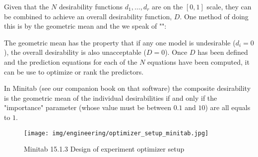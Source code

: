 	Given that the $N$ desirability functions $d_1,\ldots, d_r$ are on the $[0,1]$ scale, they can be combined to achieve an overall desirability function, $D$. One method of doing this is by the geometric mean and the we speak of "":
	
	The geometric mean has the property that if any one model is undesirable ($d_i=0$), the overall desirability is also unacceptable ($D=0$). Once $D$ has been defined and the prediction equations for each of the $N$ equations have been computed, it can be use to optimize or rank the predictors.

	In Minitab (see our companion book on that software) the composite desirability is the geometric mean of the individual desirabilities if and only if the "importance" parameter  (whose value must be between $0.1$ and $10$) are all equals to $1$.
	\begin{figure}[H]
		\centering
		\texttt{[image: img/engineering/optimizer\_setup\_minitab.jpg]}
		\caption[]{Minitab 15.1.3 Design of experiment optimizer setup}	
	\end{figure}
	
	\pagebreak
